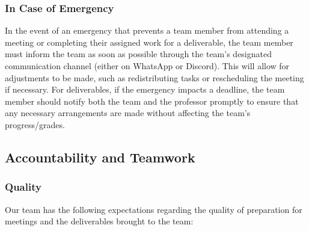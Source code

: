 \documentclass{article}
\begin{document}
\subsubsection*{\color{blue}In Case of Emergency}

In the event of an emergency that prevents a team member from attending a meeting or completing 
their assigned work for a deliverable, the team member must inform the team as soon as possible 
through the team's designated communication channel (either on WhatsApp or Discord). This will 
allow for adjustments to be made, such as redistributing tasks or rescheduling the meeting if 
necessary. For deliverables, if the emergency impacts a deadline, the team member should notify 
both the team and the professor promptly to ensure that any necessary arrangements are made 
without affecting the team's progress/grades.

\subsection*{Accountability and Teamwork}

\subsubsection*{\color{blue}Quality}

Our team has the following expectations regarding the quality of preparation for meetings and the deliverables brought to the team:
\end{document}
